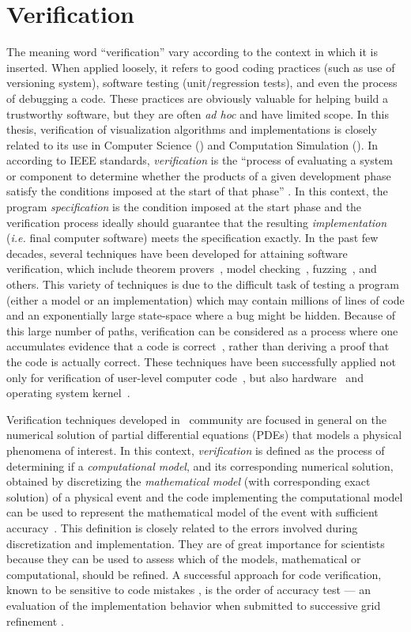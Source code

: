\section{Verification}

The meaning word ``verification'' vary according to the context in which it is inserted. When applied loosely, it refers to good coding practices
(such as use of versioning system), software testing (unit/regression tests), and even the process of debugging a code. These practices are obviously valuable for helping build a trustworthy software, but they are often \emph{ad hoc} and have limited scope. 
In this thesis, verification of visualization algorithms and implementations is closely related to its use in Computer Science (\cs) and Computation Simulation (\cse). 
In \cs{} according to IEEE standards, 
\emph{verification} is the ``process of evaluating a 
system or component to determine whether the products of a given 
development phase satisfy the conditions imposed at the start of
that phase'' \cite{159342}.
%
In this context, the program \emph{specification} is the condition
imposed at the start phase and the verification process
ideally should guarantee that the resulting \emph{implementation}
({\em i.e.} final computer software) meets the 
specification exactly. 
%
In the past
few decades, several techniques have been developed
for attaining software verification, which include theorem
provers~\cite{Bowen95}, 
model checking~\cite{Clarke08},
fuzzing~\cite{bird83, godefroid08},  and others. This variety of
techniques is due to the difficult task of testing a program (either
a model or an implementation) which may contain millions of lines
of code and an exponentially large state-space where a
bug might be 
hidden. Because of this large number of paths,
verification can be considered as a
process where one accumulates evidence that a code is
correct~\cite{roach98}, rather than deriving a proof that the code is actually correct.
These techniques have been successfully applied not only for
verification of 
user-level computer code~\cite{1646374}, but also
hardware~\cite{seger92} and  
operating system kernel~\cite{1629596}. 

Verification techniques developed in \cse~community are focused in general on the
numerical solution of partial differential equations (PDEs) that 
models a physical phenomena of
interest. In this context, 
\emph{verification} is defined as the process of determining if a
\emph{computational model}, and its corresponding numerical solution, 
obtained by discretizing the \emph{mathematical model} (with corresponding
exact solution) of a physical event and the code
implementing the computational model  
can be used to represent the mathematical model of the event with 
sufficient accuracy~\cite{babuska04}.
%
This definition is closely related to the errors involved during
discretization and implementation. They are of great importance for
scientists because they can be used to assess which of the models,
mathematical or computational, should be refined.  A successful
approach for code verification, known to be sensitive to code
mistakes \cite{roach98}, is the order of accuracy test --- an
evaluation of the implementation behavior when submitted to successive
grid refinement \cite{roach98}. 

